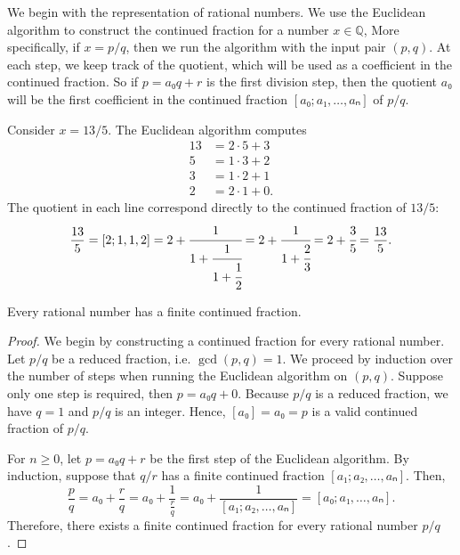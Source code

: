 We begin with the representation of rational numbers.
We use the Euclidean algorithm to construct the continued fraction for a number $x ∈ ℚ$,
More specifically, if $x = p/q$, then we run the algorithm with the input pair $(p, q)$.
At each step, we keep track of the quotient,
which will be used as a coefficient in the continued fraction.
So if $p = a₀q + r$ is the first division step, then the quotient $a₀$ will be
the first coefficient in the continued fraction $[a₀; a₁, …, aₙ]$ of $p/q$.

\begin{example}
  Consider $x = 13/5$.
  The Euclidean algorithm computes
  \begin{align*}
    13 & = 2 · 5 + 3 \\
     5 & = 1 · 3 + 2 \\
     3 & = 1 · 2 + 1 \\
     2 & = 2 · 1 + 0.
  \end{align*}
  The quotient in each line correspond directly to the continued fraction of $13/5$:
  \[
    \frac{13}{5}
    = [2; 1, 1, 2]
    = 2 + \cfrac{1}{1 + \cfrac{1}{1 + \cfrac{1}{2}}}
    = 2 + \cfrac{1}{1 + \cfrac{2}{3}}
    = 2 + \cfrac{3}{5}
    = \frac{13}{5}.
  \]
\end{example}

\begin{lemma}
  \label{lem:cf-rat}
  Every rational number has a finite continued fraction.
\end{lemma}

\begin{proof}
  We begin by constructing a continued fraction for every rational number.
  Let $p/q$ be a reduced fraction, i.e. $\gcd(p, q) = 1$.
  We proceed by induction over the number of steps when running the
  Euclidean algorithm on $(p, q)$.
  Suppose only one step is required, then $p = a₀ q + 0$.
  Because $p/q$ is a reduced fraction, we have $q = 1$ and $p/q$ is an integer.
  Hence, $[a₀] = a₀ = p$ is a valid continued fraction of $p/q$.

  For $n ≥ 0$, let $p = a₀ q + r$ be the first step of the Euclidean algorithm.
  By induction, suppose that $q/r$ has a finite continued fraction $[a₁; a₂, …, aₙ]$.
  Then,
  \[
    \frac{p}{q}
    = a₀ + \frac{r}{q}
    = a₀ + \frac{1}{\frac{r}{q}}
    = a₀ + \frac{1}{[a₁; a₂, …, aₙ]}
    = [a₀; a₁, …, aₙ].
  \]
  Therefore, there exists a finite continued fraction for every rational number $p/q$.
\end{proof}

